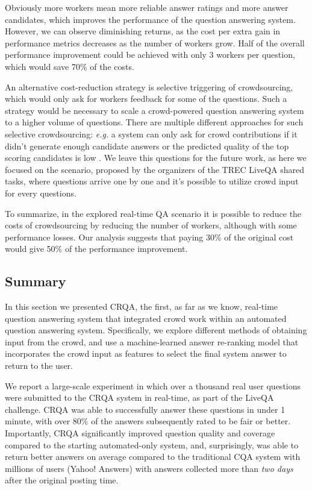 Obviously more workers mean more reliable answer ratings and more answer candidates, which improves the performance of the question answering system.
However, we can observe diminishing returns, as the cost per extra gain in performance metrics decreases as the number of workers grow.
Half of the overall performance improvement could be achieved with only 3 workers per question, which would save 70\% of the costs.

An alternative cost-reduction strategy is selective triggering of crowdsourcing, which would only ask for workers feedback for some of the questions.
Such a strategy would be necessary to scale a crowd-powered question answering system to a higher volume of questions.
There are multiple different approaches for such selective crowdsourcing: \textit{e.g.} a system can only ask for crowd contributions if it didn't generate enough candidate answers or the predicted quality of the top scoring candidates is low \cite{carmel2010estimating,he2006query}.
We leave this questions for the future work, as here we focused on the scenario, proposed by the organizers of the TREC LiveQA shared tasks, where questions arrive one by one and it's possible to utilize crowd input for every questions.

To summarize, in the explored real-time QA scenario it is possible to reduce the costs of crowdsourcing by reducing the number of workers, although with some performance losses.
Our analysis suggests that paying 30\% of the original cost would give 50\% of the performance improvement.

\subsection{Summary}

In this section we presented CRQA, the first, as far as we know, real-time question answering system that integrated crowd work within an automated question answering system.
Specifically, we explore different methods of obtaining input from the crowd, and use a machine-learned answer re-ranking model that incorporates the crowd input as features to select the final system answer to return to the user. 

We report a large-scale experiment in which over a thousand real user questions were submitted to the CRQA system in real-time, as part of the LiveQA challenge.
CRQA was able to successfully answer these questions in under 1 minute, with over 80\% of the answers subsequently rated to be fair or better.
Importantly, CRQA significantly improved question quality and coverage compared to the starting automated-only system, and, surprisingly, was able to return better answers on average compared to the traditional CQA system with millions of users (Yahoo! Answers) with answers collected more than \textit{two days} after the original posting time.

